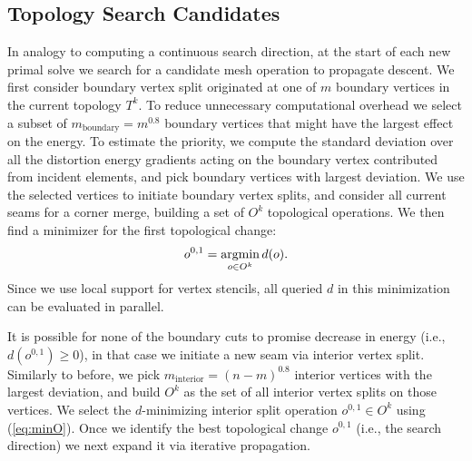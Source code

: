 \subsection{Topology Search Candidates}
\label{sec:descent_op}
In analogy to computing a continuous search direction, at the start of each new primal solve we search for a candidate mesh operation to propagate descent. 
%
We first consider boundary vertex split originated at one of $m$ boundary vertices in the current topology $T^k$. 
To reduce unnecessary computational overhead we select a subset of $m_\text{boundary}=m^{0.8}$ boundary vertices that might have the largest effect on the energy. To estimate the priority, we compute the standard deviation over all the distortion energy gradients acting on the boundary vertex contributed from incident elements, and pick boundary vertices with largest deviation. We use the selected vertices to initiate boundary vertex splits, and consider all current seams for a corner merge, building a set of $O^k$ topological operations.
%
We then find a minimizer for the first topological change:
\begin{align}
\label{eq:minO}
o^{0,1} = \operatorname*{argmin}_{o \in O^k} d(o).
\end{align}
Since we use local support for vertex stencils, all queried $d$ in this minimization can be evaluated in parallel. 

It is possible for none of the boundary cuts to promise decrease in energy (i.e., $d(o^{0,1}) \geq 0$), in that case we initiate a new seam via interior vertex split. Similarly to before, we pick $m_\text{interior}=(n-m)^{0.8}$ interior vertices with the largest deviation, and build  $O^k$ as the set of all interior vertex splits on those vertices. We select the $d$-minimizing interior split operation $o^{0,1} \in O^k$ using (\ref{eq:minO}). Once we identify the best topological change $o^{0,1}$ (i.e., the search direction) we next expand it via iterative propagation. 

%

